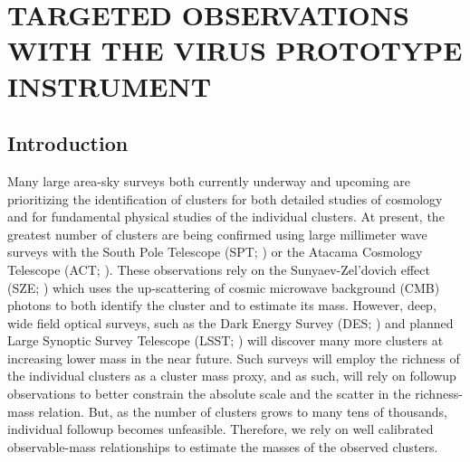%
%
%


\renewcommand*{\thefootnote}{\fnsymbol{footnote}}
\chapter[\uppercase{Targeted Observations with the VIRUS Prototype Instrument}]{\uppercase{Targeted Observations with the VIRUS Prototype Instrument}}%
\setcounter{footnote}{0}

\section{Introduction} 
Many large area-sky surveys both currently underway and upcoming are prioritizing the identification of clusters for both detailed studies of cosmology and for fundamental physical studies of the individual clusters. At present, the greatest number of clusters are being confirmed using large millimeter wave surveys with the South Pole Telescope (SPT; \citealt{Carlstrom2011}) or the Atacama Cosmology Telescope (ACT; \citealt{Swetz2011}). These observations rely on the Sunyaev-Zel'dovich effect (SZE; \citealt{Sunyaev1972}) which uses the up-scattering of cosmic microwave background (CMB) photons to both identify the cluster and to estimate its mass. However, deep, wide field optical surveys, such as the Dark Energy Survey (DES; \citealt{DES2005}) and planned Large Synoptic Survey Telescope (LSST; \citealt{LSST2012}) will discover many more clusters at increasing lower mass in the near future. Such surveys will employ the richness of the individual clusters as a cluster mass proxy, and as such, will rely on followup observations to better constrain the absolute scale and the scatter in the richness-mass relation. But, as the number of clusters grows to many tens of thousands, individual followup becomes unfeasible. Therefore, we rely on well calibrated observable-mass relationships to estimate the masses of the observed clusters.

